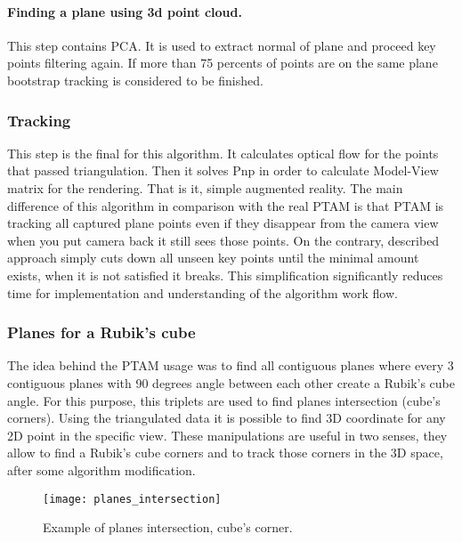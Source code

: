 \documentclass[../../main]{subfiles}
\begin{document}
\paragraph*{Finding a plane using 3d point cloud.}

This step contains \ac{PCA}. It is used to extract normal of plane and proceed key points filtering again. If more than 75 percents of points are on the same plane bootstrap tracking is considered to be finished.

\subsubsection{Tracking}

This step is the final for this algorithm. It calculates optical flow for the points that passed triangulation. Then it solves \ac{Pnp} in order to calculate Model-View matrix for the rendering. That is it, simple augmented reality.
The main difference of this algorithm in comparison with the real \ac{PTAM} is that \ac{PTAM} is tracking all captured plane points even if they disappear from the camera view when you put camera back it still sees those points. On the contrary, described approach simply cuts down all unseen key points until the minimal amount exists, when it is not satisfied it breaks. This simplification significantly reduces time for implementation and understanding of the algorithm work flow.

\subsubsection{Planes for a Rubik's cube}

The idea behind the \ac{PTAM} usage was to find all contiguous planes where every 3 contiguous planes with 90 degrees angle between each other create a Rubik's cube angle. For this purpose, this triplets are used to find planes intersection (cube's corners). Using the triangulated data it is possible to find 3D coordinate for any 2D point in the specific view. These manipulations are useful in two senses, they allow to find a Rubik's cube corners and to track those corners in the 3D space, after some algorithm modification.

\begin{figure} [ht]
    \begin{center}
        \texttt{[image: planes\_intersection]}
        \caption{Example of planes intersection, cube's corner.}
        \label{fig:planes_intersection}
    \end{center}
\end{figure}
\end{document}
